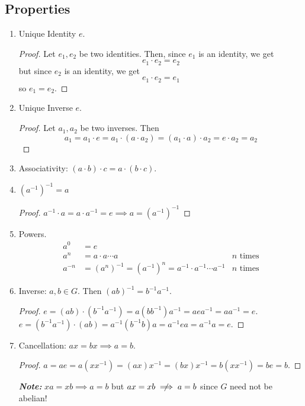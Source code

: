 \documentclass{report}
\newcommand{\textib}[1]{\textit{\textbf{{#1}}}}
\begin{document}
\subsection{Properties}
\begin{enumerate}[label=\textit{(\roman*)}]
    \item Unique Identity $e$.
        \begin{proof}
            Let $e_1, e_2$ be two identities. Then, since $e_1$ is an identity, we get
            \[e_1 \cdot e_2 = e_2\]
            but since $e_2$ is an identity, we get 
            \[e_1 \cdot e_2 = e_1\]
            so $e_1 = e_2$.
        \end{proof}
    \item Unique Inverse $e$.
        \begin{proof}
            Let $a_1, a_2$ be two inverses. Then
            \[a_1 = a_1 \cdot e = a_1 \cdot (a \cdot a_2) = (a_1 \cdot a) \cdot a_2 = e \cdot a_2 = a_2\]
        \end{proof}
    \item Associativity: $(a \cdot b) \cdot c = a \cdot (b \cdot c)$.
    \item $\left( a^{-1} \right)^{-1} = a$
        \begin{proof}
            $a^{-1} \cdot a = a \cdot a^{-1} = e \implies a = \left( a^{-1} \right)^{-1}$
        \end{proof}
    \item Powers.
        \begin{align*}
            a^0 &= e \\
            a^n &= a \cdot a \cdots a & n \text{ times} \\
            a^{-n} &= \left( a^{n} \right)^{-1} = \left( a^{-1} \right)^n = a^{-1} \cdot a^{-1} \cdots a^{-1} & n \text{ times}
        \end{align*}
    \item Inverse: $a, b \in G$. Then $\left( ab \right)^{-1} = b^{-1} a^{-1}$.
        \begin{proof}
            $e = (ab) \cdot (b^{-1} a^{-1}) = a (bb^{-1}) a^{-1} = aea^{-1} = aa^{-1} = e$. \\
            $e = (b^{-1} a^{-1}) \cdot (ab) = a^{-1} (b^{-1}b) a = a^{-1}ea = a^{-1}a = e$.
        \end{proof}
    \item Cancellation: $ax = bx \implies a = b$.
        \begin{proof}
            $a = ae = a\left(xx^{-1}\right) = (ax)x^{-1} = (bx)x^{-1} = b\left(xx^{-1}\right) = be = b$.
        \end{proof}
        \textib{Note:} $xa = xb \implies a = b$ but $ax = xb \centernot \implies a = b$ since $G$ need not
        be abelian!
\end{enumerate}
\end{document}
